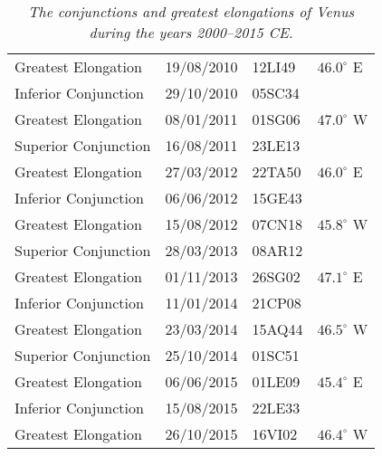 \begin{table}
{\begin{tabular}{lcll}
Greatest Elongation & 19/08/2010 & 12LI49 & $46.0^\circ$ E\\
Inferior Conjunction & 29/10/2010 & 05SC34&\\
Greatest Elongation & 08/01/2011 & 01SG06 & $47.0^\circ$ W\\
Superior Conjunction & 16/08/2011 & 23LE13&\\
Greatest Elongation & 27/03/2012 & 22TA50 & $46.0^\circ$ E\\
Inferior Conjunction & 06/06/2012 & 15GE43&\\
Greatest Elongation & 15/08/2012 & 07CN18 & $45.8^\circ$ W\\
Superior Conjunction & 28/03/2013 & 08AR12&\\
Greatest Elongation & 01/11/2013 & 26SG02 & $47.1^\circ$ E\\
Inferior Conjunction & 11/01/2014 & 21CP08&\\
Greatest Elongation & 23/03/2014 & 15AQ44 & $46.5^\circ$ W\\
Superior Conjunction & 25/10/2014 & 01SC51&\\
Greatest Elongation & 06/06/2015 & 01LE09 & $45.4^\circ$ E\\
Inferior Conjunction & 15/08/2015 & 22LE33&\\
Greatest Elongation & 26/10/2015 & 16VI02 & $46.4^\circ$ W\\
\end{tabular}}
\caption{\em The conjunctions and greatest elongations of Venus
during the years 2000--2015 CE.}\label{vtvenus}
\end{table}

